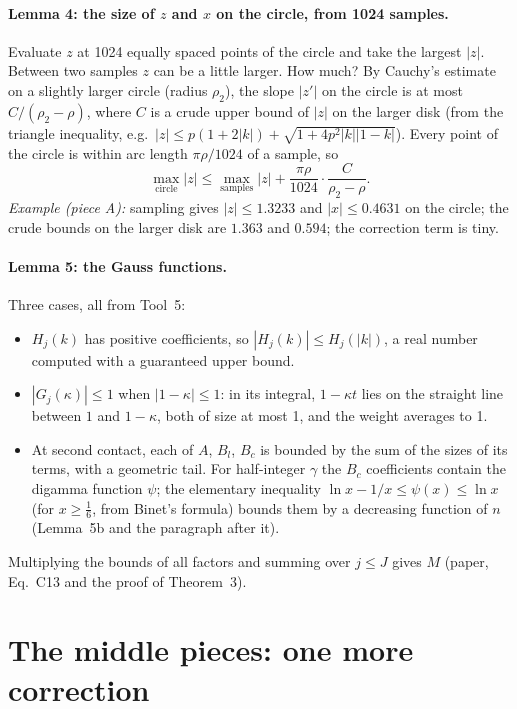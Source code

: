 \documentclass[11pt,a4paper]{article}
\theoremstyle{remark}
\begin{document}
\paragraph{Lemma 4: the size of $z$ and $x$ on the circle, from 1024 samples.} Evaluate $z$ at
1024 equally spaced points of the circle and take the largest $|z|$. Between two samples $z$ can be
a little larger. How much? By Cauchy's estimate on a slightly larger circle (radius $\rho_2$), the
slope $|z'|$ on the circle is at most $C/(\rho_2-\rho)$, where $C$ is a crude upper bound of $|z|$
on the larger disk (from the triangle inequality, e.g.\ $|z|\le p(1+2|k|)+\sqrt{1+4p^2|k||1-k|}$).
Every point of the circle is within arc length $\pi\rho/1024$ of a sample, so
\[
  \max_{\text{circle}}|z|\le\max_{\text{samples}}|z|+\frac{\pi\rho}{1024}\cdot\frac{C}{\rho_2-\rho}.
\]
\emph{Example (piece A):} sampling gives $|z|\le1.3233$ and $|x|\le0.4631$ on the circle; the crude
bounds on the larger disk are $1.363$ and $0.594$; the correction term is tiny.

\paragraph{Lemma 5: the Gauss functions.} Three cases, all from Tool~5:
\begin{itemize}
  \item $H_j(k)$ has positive coefficients, so $|H_j(k)|\le H_j(|k|)$, a real number computed with a
        guaranteed upper bound.
  \item $|G_j(\kappa)|\le1$ when $|1-\kappa|\le1$: in its integral, $1-\kappa t$ lies on the straight
        line between $1$ and $1-\kappa$, both of size at most 1, and the weight averages to 1.
  \item At second contact, each of $A$, $B_l$, $B_c$ is bounded by the sum of the sizes of its
        terms, with a geometric tail. For half-integer $\gamma$ the $B_c$ coefficients contain the
        digamma function $\psi$; the elementary inequality $\ln x-1/x\le\psi(x)\le\ln x$ (for
        $x\ge\tfrac16$, from Binet's formula) bounds them by a decreasing function of $n$
        (Lemma~5b and the paragraph after it).
\end{itemize}
Multiplying the bounds of all factors and summing over $j\le J$ gives $M$ (paper, Eq.~C13 and the
proof of Theorem~3).

\section{The middle pieces: one more correction}
\label{sec:eta}
\end{document}
